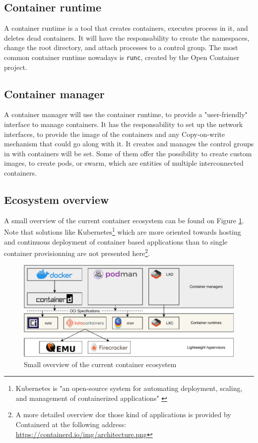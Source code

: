 \subsection{Container runtime}
A container runtime is a tool that creates containers, executes process in it, and deletes dead containers.  It will have the responsability to create the namespaces, change the root directory, and attach processes to a control group.  The most common container runtime nowadays is \texttt{runc}, created by the Open Container project.

\subsection{Container manager}
A container manager will use the container runtime, to provide a "user-friendly" interface to manage containers.  It has the responsability to set up the network interfaces, to provide the image of the containers and any Copy-on-write mechanism that could go along with it.  It creates and manages the control groups in with containers will be set.  Some of them offer the possibility to create custom images, to create pods, or swarm, which are entities of multiple interconnected containers.

\subsection{Ecosystem overview}
A small overview of the current container ecosystem can be found on Figure \ref{fig:overview}.  Note that solutions like Kubernetes\footnote{Kubernetes is "an open-source system for automating deployment, scaling, and management of containerized applications" \cite{kubernetes}} which are more oriented towards hosting and continuous deployment of container based applications than to single container provisionning are not presented here\footnote{A more detailed overview dor those kind of applications is provided by Containerd at the following address: \href{https://containerd.io/img/architecture.png}{https://containerd.io/img/architecture.png}}.
\begin{figure}[h!]
  \begin{center}
    \includegraphics[width=\linewidth]{images/ecosystem.pdf}
    \caption{Small overview of the current container ecosystem}
    \label{fig:overview}
  \end{center}
\end{figure}
